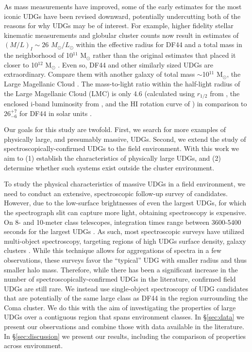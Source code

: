 \documentclass[twocolumn,tighten]{aastex63}
\begin{document}
As mass measurements have improved, 
some of the early estimates for the most iconic UDGs have been revised downward, potentially undercutting both of the reasons for why UDGs may be of interest. For example, higher fidelity 
stellar kinematic measurements and globular cluster counts now result in estimates
of $(M/L)_I \sim 26$ $M_\odot/L_\odot$ within the effective radius for DF44 \citep{vanDokkum2019b} and a total mass in the neighborhood of 10$^{11}$ M$_\odot$ rather than the original estimates that placed it closer to 10$^{12}$ M$_\odot$ \citep{vanDokkum2019b, Saifollahi2020}.
Even so, DF44 and other similarly sized UDGs are extraordinary. Compare them with another galaxy of total mass $\sim$10$^{11}$ M$_\odot$, the Large Magellanic Cloud \citep{erkal}.
The mass-to-light ratio within the half-light radius of the Large Magellanic Cloud (LMC) is only 4.6 (calculated using $r_{1/2}$ from \citealt{Drlica-Wagner2020}, the enclosed i-band luminosity from \citealt{Eskew2011}, and the HI rotation curve of \citealt{Kim1998})
in comparison to $26^{+7}_{-6}$ for DF44 in solar units \citep{vanDokkum2019b}.

Our goals for this study are twofold. First, we search for more examples of physically large, and presumably massive, UDGs. Second, we extend the study of spectroscopically-confirmed UDGs to the field environment. With this work we aim to 
(1) establish the characteristics of physically large UDGs, and
(2) determine whether  such systems exist outside the cluster environment.

To study the physical characteristics of massive UDGs in a field environment, we need to conduct an extensive, spectroscopic follow-up survey of candidates. However, due to the low-surface brightnesses of even the largest UDGs, for which the spectrograph slit can  capture more light, obtaining spectroscopy is expensive. On 8- and 10-meter class telescopes, integration times range between 3600-5400 seconds for the largest UDGs \citep{Kadowaki17,vanDokkum2015b}. As such, most spectroscopic surveys have utilized multi-object spectroscopy, targeting regions of high UDGs surface density, galaxy clusters  \citep{Alabi18,Ruiz18,Chilingarian2019}. While this technique allows for  aggregations of spectra in a few observations, these surveys favor the ``typical'' UDG with smaller radius and thus smaller halo mass. Therefore, while there has been a significant increase in the number of spectroscopically-confirmed UDGs in the literature, confirmed field UDGs are still rare. We instead use single-object spectroscopy of UDG candidates that are potentially of the same large class as DF44 in the region surrounding the Coma cluster. We do this with the aim of investigating the properties of large UDGs over a contiguous region that spans environment classes. In \S\ref{sec:data} we present our observations and combine those with data available in the literature. In \S\ref{sec:discussion} we present our results, including the comparison of properties across environment. 
\end{document}
